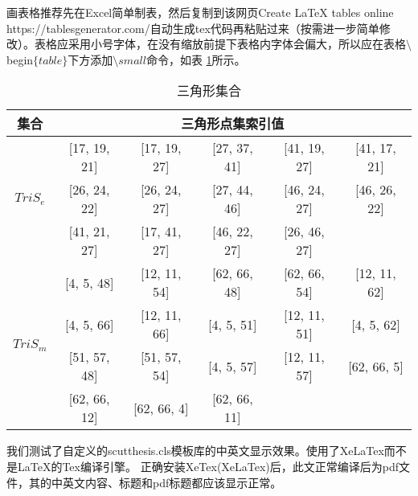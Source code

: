 \documentclass[unicode,pdfcover]{scutthesis}
\begin{document}
画表格推荐先在Excel简单制表，然后复制到该网页{Create LaTeX tables online https://tablesgenerator.com/}自动生成tex代码再粘贴过来（按需进一步简单修改）。表格应采用小号字体，在没有缩放前提下表格内字体会偏大，所以应在表格$\setminus$begin$\{table\}$下方添加$\setminus small$命令，如表 \ref{T23}所示。
\begin{table}[htp]
\small%
\centering
\caption{三角形集合}
\label{T23}
\begin{tabular}{c|ccccc}\hline
 集合 & \multicolumn{5}{c}{三角形点集索引值} \\ \hline
\multirow{3}{*}{$TriS_{e}$} & [17, 19, 21] & [17, 19, 27] & [27, 37, 41] & [41, 19, 27] & [41, 17, 21] \\ %
                      & [26, 24, 22] & [26, 24, 27] & [27, 44, 46] & [46, 24, 27] & [46, 26, 22] \\ %
                      & [41, 21, 27] & [17, 41, 27] & [46, 22, 27] & [26, 46, 27] &            \\ \hline
\multirow{4}{*}{$TriS_{m}$} & [4, 5, 48]   & [12, 11, 54] & [62, 66, 48] & [62, 66, 54] & [12, 11, 62] \\ %
                      & [4, 5, 66]   & [12, 11, 66] & [4, 5, 51]   & [12, 11, 51] & [4, 5, 62]   \\ %
                      & [51, 57, 48] & [51, 57, 54] & [4, 5, 57]   & [12, 11, 57] & [62, 66, 5]  \\ %
                      & [62, 66, 12] & [62, 66, 4]  & [62, 66, 11] &             &             \\ \hline
\end{tabular}
\end{table}



我们测试了自定义的scutthesis.cls模板库的中英文显示效果。使用了XeLaTex而不是\LaTeX{}的Tex编译引擎。
正确安装XeTex(XeLaTex)后，此文正常编译后为pdf文件，其的中英文内容、标题和pdf标题都应该显示正常。


\backmatter



\setcounter{table}{0}
\setcounter{figure}{0}
\setcounter{equation}{0}
\renewcommand{\theequation}{\textbf{A}-\arabic{equation}}%
\renewcommand{\thetable}{\textbf{A}-\arabic{table}}%
\renewcommand{\thefigure}{\textbf{A}-\arabic{figure}}%
%
\end{document}
